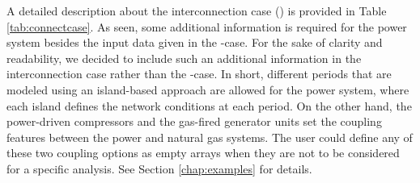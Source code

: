 \begin{appendix}
A detailed description about the interconnection case () is provided in Table \ref{tab:connectcase}. As seen, some additional information is required for the power system besides the input data given in the \matpower{}-case. For the sake of clarity and readability, we decided to include such an additional information in the interconnection case rather than the \matpower{}-case. In short, different periods that are modeled using an island-based approach are allowed for the power system, where each island defines the network conditions at each period. On the other hand, the power-driven compressors and the gas-fired generator units set the coupling features between the power and natural gas systems. The user could define any of these two coupling options as empty arrays when they are not to be considered for a specific analysis. See Section \ref{chap:examples} for details.



\end{appendix}
